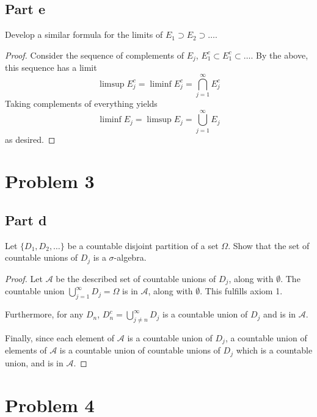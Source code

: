 \documentclass[paper=a4, fontsize=11pt]{scrartcl} %
\numberwithin{equation}{section} %
\numberwithin{figure}{section} %
\numberwithin{table}{section} %
\begin{document}
\subsection*{Part e}
Develop a similar formula for the limits of $E_1 \supset E_2 \supset \ldots$.
\\
\begin{proof}
Consider the sequence of complements of $E_j$, $E_1^c \subset E_1^c \subset \ldots$.
By the above, this sequence has a limit
\[
\limsup E_j^c = \liminf E_j^c = \bigcap_{j=1}^{\infty} E_j^c
\]
Taking complements of everything yields
\[
\liminf E_j = \limsup E_j = \bigcup_{j=1}^{\infty} E_j
\]
as desired.

\end{proof}


\section*{Problem 3}
\subsection*{Part d}
Let $\{D_1, D_2, \ldots\}$ be a countable disjoint partition of a set $\Omega$.
Show that the set of countable unions of $D_j$ is a $\sigma$-algebra.
\\
\begin{proof}
Let $\mathcal{A}$ be the described set of countable unions of $D_j$, along with $\emptyset$.
The countable union $\bigcup_{j=1}^{\infty}D_j = \Omega$ is in $\mathcal{A}$, along with
$\emptyset$. This fulfills axiom 1.

Furthermore, for any $D_n$, $D_n^c = \bigcup_{j\neq n}^{\infty} D_j$ is a countable union
of $D_j$ and is in $\mathcal{A}$.

Finally, since each element of $\mathcal{A}$ is a countable union of $D_j$,
a countable union of elements of $\mathcal{A}$ is a countable union of countable unions
of $D_j$ which is a countable union, and is in $\mathcal{A}$.
\end{proof}

\section*{Problem 4}
\end{document}

